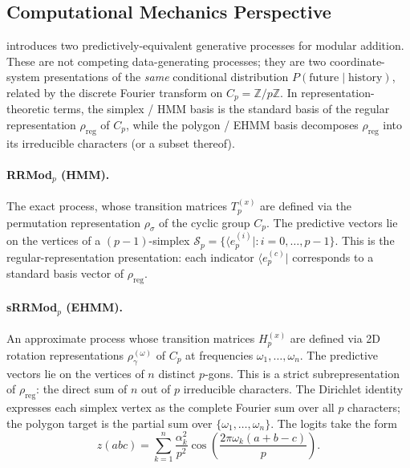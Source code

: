 \documentclass[11pt,a4paper]{article}
\begin{document}
\subsection{Computational Mechanics Perspective}\label{sec:compmech}

\citet{poncini2025compmech} introduces two predictively-equivalent generative processes for modular addition. These are not competing data-generating processes; they are two coordinate-system presentations of the \emph{same} conditional distribution $P(\text{future} \mid \text{history})$, related by the discrete Fourier transform on $C_p = \mathbb{Z}/p\mathbb{Z}$. In representation-theoretic terms, the simplex / HMM basis is the standard basis of the regular representation $\rho_{\mathrm{reg}}$ of $C_p$, while the polygon / EHMM basis decomposes $\rho_{\mathrm{reg}}$ into its irreducible characters (or a subset thereof).

\paragraph{RRMod$_p$ (HMM).} The exact process, whose transition matrices $T^{(x)}_p$ are defined via the permutation representation $\rho_\sigma$ of the cyclic group $C_p$. The predictive vectors lie on the vertices of a $(p{-}1)$-simplex $\mathcal{S}_p = \{\langle e^{(i)}_p | : i = 0, \ldots, p{-}1\}$. This is the regular-representation presentation: each indicator $\langle e^{(c)}_p |$ corresponds to a standard basis vector of $\rho_{\mathrm{reg}}$.

\paragraph{sRRMod$_p$ (EHMM).} An approximate process whose transition matrices $H^{(x)}_p$ are defined via 2D rotation representations $\rho_{\gamma}^{(\omega)}$ of $C_p$ at frequencies $\omega_1, \ldots, \omega_n$. The predictive vectors lie on the vertices of $n$ distinct $p$-gons. This is a strict subrepresentation of $\rho_{\mathrm{reg}}$: the direct sum of $n$ out of $p$ irreducible characters. The Dirichlet identity expresses each simplex vertex as the complete Fourier sum over all $p$ characters; the polygon target is the partial sum over $\{\omega_1, \ldots, \omega_n\}$. The logits take the form
\begin{equation}\label{eq:logits}
    z(abc) = \sum_{k=1}^{n} \frac{\alpha_k^2}{p^2} \cos\!\left(\frac{2\pi \omega_k (a + b - c)}{p}\right).
\end{equation}
\end{document}

